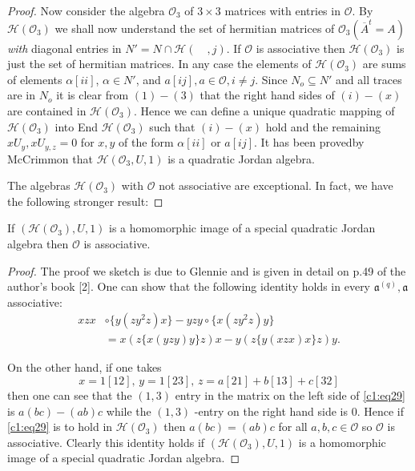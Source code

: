 \begin{proof}
Now consider the algebra $\mathcal{O}_3$ of $3\times 3$ matrices with
entries in $\mathcal{O}$. By $\mathscr{H}(\mathcal{O}_3)$ we shall now
understand the set of hermitian matrices of
$\mathcal{O}_3(\overline{A}^{t}=A)${\em with} diagonal entries in
$N'=N\cap\mathscr{H}(\quad, j)$. If $\mathcal{O}$ is associative then
$\mathscr{H}(\mathcal{O}_3)$ is just the set of hermitian matrices. In
any case the elements of $\mathscr{H}(\mathcal{O}_3)$ are sums of
elements $\alpha[ii]$, $\alpha\in N'$, and $a[ij], a\in
\mathcal{O}, i\neq j$. Since $N_o\subseteq N'$ and all traces are in
$N_o$ it is clear from $(1)-(3)$ that the right hand sides of
$(i)-(x)$ are contained in $\mathscr{H}(\mathcal{O}_3)$. Hence we can
define a unique quadratic mapping of $\mathscr{H}(\mathcal{O}_3)$ into
End $\mathscr{H}(\mathcal{O}_3)$ such that $(i)-(x)$ hold and the
remaining $x U_y, xU_{y,z}=0$ for $x,y$ of the form $\alpha[ii]$ or
$a[ij]$. It has been proved\pageoriginale by McCrimmon that
$\mathscr{H}(\mathcal{O}_3,U,1)$ is a quadratic Jordan algebra.

The algebras $\mathscr{H}(\mathcal{O}_3)$ with $\mathcal{O}$ not
associative are exceptional. In fact, we have the following stronger result:
\end{proof}

\begin{thm}\label{c1:thm6}
If $(\mathscr{H}(\mathcal{O}_3),U,1)$ is a homomorphic image of a
special quadratic Jordan algebra then $\mathcal{O}$ is associative.
\end{thm}

\begin{proof}
The proof we sketch is due to Glennie and is given in detail on p.49
of the author's book [2]. One can show that the following identity
holds in every $\mathfrak{a}^{(q)},\mathfrak{a}$ associative:
\begin{align*}
  xzx &\circ \{y(zy^{2} z)x\}-yzy \circ \{x(zy^{2} z)y\}\\
  &=x(z\{x(yzy)y\}z)x-y(z\{y(xzx)x\}z)y.\tag{29}\label{c1:eq29}
\end{align*}

On the other hand, if one takes
$$
x=1[12],\, y=1[23],\, z=a[21]+b[13]+c[32]
$$
then one can see that the $(1,3)$ entry in the matrix on the left side
of \eqref{c1:eq29} is $a(bc)-(ab)c$ while the $(1,3)$ -entry on the right hand
side is $0$. Hence if \eqref{c1:eq29} is to hold in
$\mathscr{H}(\mathcal{O}_3)$ then $a(b c)=(ab)c$ for  all
$a,b,c\in \mathcal{O}$ so $\mathcal{O}$ is associative. Clearly
this identity holds if $(\mathscr{H}(\mathcal{O}_3),U,1)$ is a
homomorphic image of a special quadratic Jordan algebra.
\end{proof}

